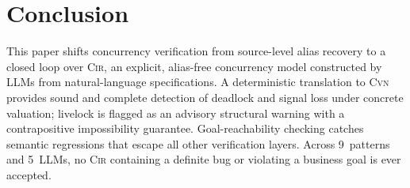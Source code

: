 \section{Conclusion}
\label{sec:conclusion}

This paper shifts concurrency verification from source-level alias recovery to a closed loop over \textsc{Cir}, an explicit, alias-free concurrency model constructed by LLMs from natural-language specifications. A deterministic translation to \textsc{Cvn} provides sound and complete detection of deadlock and signal loss under concrete valuation; livelock is flagged as an advisory
structural warning with a contrapositive impossibility guarantee. Goal-reachability checking catches semantic regressions that escape all other verification layers. Across 9~patterns and 5~LLMs, no \textsc{Cir} containing a definite bug or violating a business goal is ever accepted.
